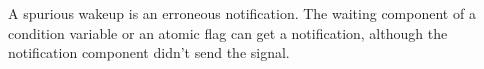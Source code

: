 A spurious wakeup is an erroneous notification. The waiting component of a condition variable or an atomic flag can get a notification, although the notification component didn’t send the signal.